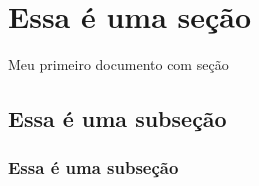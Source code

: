 \documentclass{article}
\begin{document}
	\section{Essa é uma seção}
	Meu primeiro documento com seção
	\subsection{Essa é uma subseção}
	\subsubsection{Essa é uma subseção}
\end{document}
